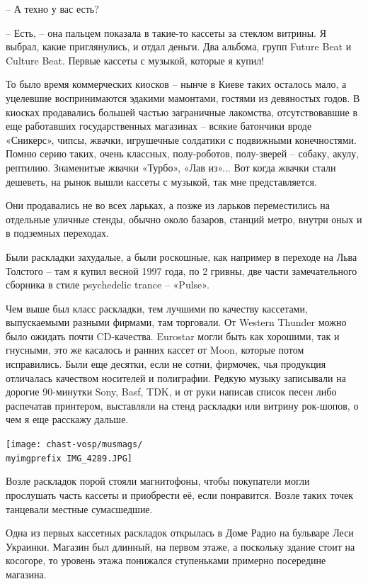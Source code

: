  – А техно у вас есть?

 – Есть, – она пальцем показала в такие-то кассеты за стеклом витрины. Я выбрал, какие приглянулись, и отдал деньги. Два альбома, групп Future Beat и Culture Beat. Первые кассеты с музыкой, которые я купил!

То было время коммерческих киосков – нынче в Киеве таких осталось мало, а уцелевшие воспринимаются эдакими мамонтами, гостями из девяностых годов. В киосках продавались большей частью заграничные лакомства, отсутствовавшие в еще работавших государственных магазинах – всякие батончики вроде «Сникерс», чипсы, жвачки, игрушечные солдатики с подвижными конечностями. Помню серию таких, очень классных, полу-роботов, полу-зверей – собаку, акулу, рептилию. Знаменитые жвачки «Турбо», «Лав из»... Вот когда жвачки стали дешеветь, на рынок вышли кассеты с музыкой, так мне представляется.

Они продавались не во всех ларьках, а позже из ларьков переместились на отдельные уличные стенды, обычно около базаров, станций метро, внутри оных и в подземных переходах. 

Были раскладки захудалые, а были роскошные, как например в переходе на Льва Толстого – там я купил весной 1997 года, по 2 гривны, две части замечательного сборника в стиле psychedelic trance – «Pulse». 

Чем выше был класс раскладки, тем лучшими по качеству кассетами, выпускаемыми разными фирмами, там торговали. От Western Thunder можно было ожидать почти CD-качества. Eurostar могли быть как хорошими, так и гнусными, это же касалось и ранних кассет от Moon, которые потом исправились. Были еще десятки, если не сотни, фирмочек, чья продукция отличалась качеством носителей и полиграфии. Редкую музыку записывали на дорогие 90-минутки Sony, Basf, TDK, и от руки написав список песен либо распечатав принтером, выставляли на стенд раскладки или витрину рок-шопов, о чем я еще расскажу дальше.

\begin{center}
\texttt{[image: chast-vosp/musmags/\\myimgprefix IMG\_4289.JPG]}
\end{center}

Возле раскладок порой стояли магнитофоны, чтобы покупатели могли прослушать часть кассеты и приобрести её, если понравится. Возле таких точек танцевали местные сумасшедшие.

Одна из первых кассетных раскладок открылась в Доме Радио на бульваре Леси Украинки. Магазин был длинный, на первом этаже, а поскольку здание стоит на косогоре, то уровень этажа понижался ступеньками примерно посередине магазина.

